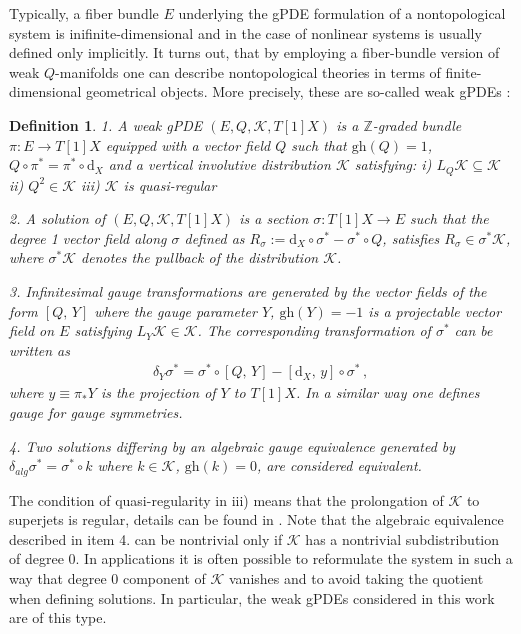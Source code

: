 \documentclass[a4paper,12pt]{article}
\numberwithin{equation}{section} %
\newtheorem{definition}[thm]{Definition}
\newcommand{\gh}[1]{\mathrm{gh}(#1)}
\newcommand{\dx}{\mathrm{d}_X}
\newcommand{\commut}[2]{[#1{,}\,#2]}
\def\cK{\mathcal{K}}
\begin{document}
Typically, a fiber bundle $E$ underlying the gPDE formulation of a nontopological system is inifinite-dimensional and in the case of nonlinear systems is usually defined only implicitly. It turns out, that 
by  employing a fiber-bundle version of weak $Q$-manifolds one can describe nontopological theories in terms of finite-dimensional geometrical objects. More precisely, these are so-called weak gPDEs \cite{Grigoriev:2024ncm}:
\begin{definition} \label{def:weak-gPDE}
    1. A weak gPDE $(E,Q,\cK,T[1]X)$ is a $\mathbb{Z}$-graded bundle $\pi: E \rightarrow T[1]X$ equipped with a vector field $Q$ such that $\gh{Q} = 1$, $Q \circ \pi^* = \pi^* \circ \dx$ and a vertical involutive distribution $\cK$ satisfying:
    i) $L_Q \cK \subseteq \cK$
    ii) $Q^2 \in \cK$ 
    iii) $\cK$ is quasi-regular 
    
    2. A solution of $(E,Q,\cK,T[1]X)$ is a section $\sigma:T[1]X \rightarrow E$ such that the degree 1 vector field along $\sigma$ defined as $R_\sigma := \dx \circ \sigma^* - \sigma^* \circ Q$, satisfies
    $R_\sigma \in \sigma^*\cK$, where $\sigma^*\cK$ denotes the pullback of the distribution $\cK$.
    
    3. Infinitesimal gauge transformations are generated by the vector fields of the form $\commut{Q}{Y}$ where the gauge parameter $Y$, $\gh{Y}=-1$ is a projectable  vector field on $E$ satisfying $L_Y \cK \in \cK$. The corresponding transformation of $\sigma^*$ can be written as 
    \begin{align}\label{gaugetransf2}
        \delta_Y\sigma^{*}={\sigma}^{*}\circ \commut{Q}{Y}-\commut{\dx}{y}\circ \sigma^*\,,
    \end{align}
    where $y\equiv \pi_* Y$ is the projection of $Y$ to $T[1]X$.  In a similar way one defines gauge for gauge symmetries.

    4. Two solutions differing by an algebraic gauge equivalence generated by $\delta_{alg} \sigma^* = \sigma^* \circ k$ where $k\in \cK$, $\gh{k} = 0$, are considered equivalent.
\end{definition}
The condition of quasi-regularity in iii) means that the prolongation of $\cK$ to superjets is regular, details can be found in \cite{Grigoriev:2024ncm}. Note that the algebraic equivalence described in item 4. can be nontrivial only if $\cK$ has a nontrivial subdistribution of degree $0$. In applications it is often possible to reformulate the system in such a way that degree $0$ component of $\cK$ vanishes and to avoid taking the quotient when defining solutions. In particular, the weak gPDEs considered in this work are of this type.
\end{document}
